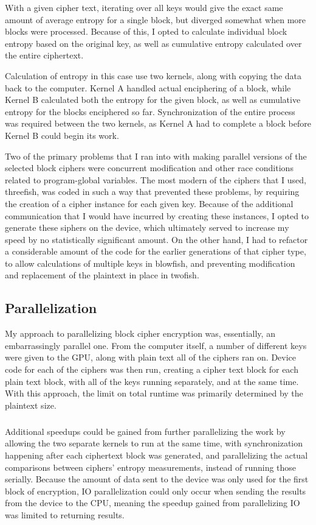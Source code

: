\documentclass[11.5pt]{article}
\begin{document}
With a given cipher text, iterating over all keys would give the exact same amount of average entropy for a single block, but diverged somewhat when more blocks were processed. Because of this, I opted to calculate individual block entropy based on the original key, as well as cumulative entropy calculated over the entire ciphertext.

Calculation of entropy in this case use two kernels, along with copying the data back to the computer. Kernel A handled actual enciphering of a block, while Kernel B calculated both the entropy for the given block, as well as cumulative entropy for the blocks enciphered so far. Synchronization of the entire process was required between the two kernels, as Kernel A had to complete a block before Kernel B could begin its work.

Two of the primary problems that I ran into with making parallel versions of the selected block ciphers were concurrent modification and other race conditions related to program-global variables. The most modern of the ciphers that I used, threefish, was coded in such a way that prevented these problems, by requiring the creation of a cipher instance for each given key. Because of the additional communication that I would have incurred by creating these instances, I opted to generate these siphers on the device, which ultimately served to increase my speed by no statistically significant amount. On the other hand, I had to refactor a considerable amount of the code for the earlier generations of that cipher type, to allow calculations of multiple keys in blowfish, and preventing modification and replacement of the plaintext in place in twofish.

\subsection*{Parallelization}
My approach to parallelizing block cipher encryption was, essentially, an embarrassingly parallel one. From the computer itself, a number of different keys were given to the GPU, along with plain text all of the ciphers ran on. Device code for each of the ciphers was then run, creating a cipher text block for each plain text block, with all of the keys running separately, and at the same time. With this approach, the limit on total runtime was primarily determined by the plaintext size.

\subparagraph*{}Additional speedups could be gained from further parallelizing the work by allowing the two separate kernels to run at the same time, with synchronization happening after each ciphertext block was generated, and parallelizing the actual comparisons between ciphers' entropy measurements, instead of running those serially. Because the amount of data sent to the device was only used for the first block of encryption, IO parallelization could only occur when sending the results from the device to the CPU, meaning the speedup gained from parallelizing IO was limited to returning results.
\end{document}
